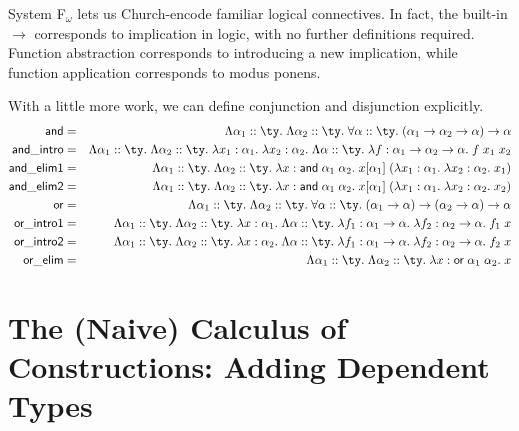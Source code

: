 \documentclass{amsbook}
\theoremstyle{definition}
\theoremstyle{remark}
\numberwithin{section}{chapter}
\numberwithin{equation}{chapter}
\begin{document}
System F$_\omega$ lets us Church-encode familiar logical connectives.
In fact, the built-in $\to$ corresponds to implication in logic, with no further definitions required.
Function abstraction corresponds to introducing a new implication, while function application corresponds to modus ponens.

With a little more work, we can define conjunction and disjunction explicitly.
\begin{eqnarray*}
  \lc{and} &=& \Lambda \alpha_1 :: \ty. \; \Lambda \alpha_2 :: \ty. \; \forall \alpha :: \ty. \; (\alpha_1 \to \alpha_2 \to \alpha) \to \alpha \\
  \lc{and\_intro} &=& \Lambda \alpha_1 :: \ty. \; \Lambda \alpha_2 :: \ty. \; \lambda x_1 : \alpha_1. \; \lambda x_2 : \alpha_2. \; \Lambda \alpha :: \ty. \; \lambda f : \alpha_1 \to \alpha_2 \to \alpha. \; f \; x_1 \; x_2 \\
  \lc{and\_elim1} &=& \Lambda \alpha_1 :: \ty. \; \Lambda \alpha_2 :: \ty. \; \lambda x : \lc{and} \; \alpha_1 \; \alpha_2. \; x[\alpha_1] \; (\lambda x_1 : \alpha_1. \; \lambda x_2 : \alpha_2. \; x_1) \\
  \lc{and\_elim2} &=& \Lambda \alpha_1 :: \ty. \; \Lambda \alpha_2 :: \ty. \; \lambda x : \lc{and} \; \alpha_1 \; \alpha_2. \; x[\alpha_1] \; (\lambda x_1 : \alpha_1. \; \lambda x_2 : \alpha_2. \; x_2) \\
  \lc{or} &=& \Lambda \alpha_1 :: \ty. \; \Lambda \alpha_2 :: \ty. \; \forall \alpha :: \ty. \; (\alpha_1 \to \alpha) \to (\alpha_2 \to \alpha) \to \alpha \\
  \lc{or\_intro1} &=& \Lambda \alpha_1 :: \ty. \; \Lambda \alpha_2 :: \ty. \; \lambda x : \alpha_1. \; \Lambda \alpha :: \ty. \; \lambda f_1 : \alpha_1 \to \alpha. \; \lambda f_2 : \alpha_2 \to \alpha. \; f_1 \; x \\
  \lc{or\_intro2} &=& \Lambda \alpha_1 :: \ty. \; \Lambda \alpha_2 :: \ty. \; \lambda x : \alpha_2. \; \Lambda \alpha :: \ty. \; \lambda f_1 : \alpha_1 \to \alpha. \; \lambda f_2 : \alpha_2 \to \alpha. \; f_2 \; x \\
  \lc{or\_elim} &=& \Lambda \alpha_1 :: \ty. \; \Lambda \alpha_2 :: \ty. \; \lambda x : \lc{or} \; \alpha_1 \; \alpha_2. \; x
\end{eqnarray*}

\section{The (Naive) Calculus of Constructions: Adding Dependent Types}
\end{document}
